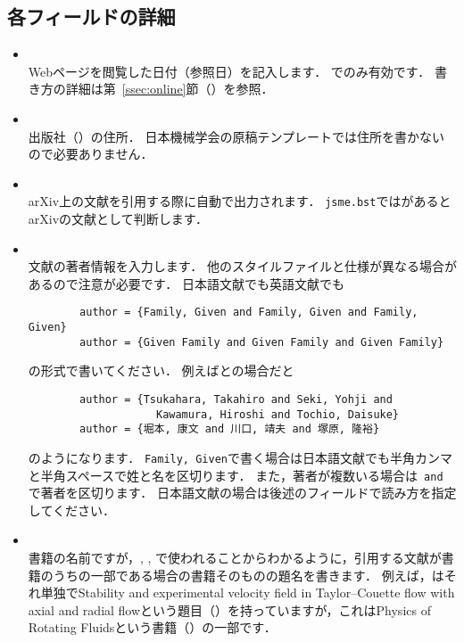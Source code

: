 \documentclass[a4paper,fleqn,uplatex,dvipdfmx]{jsarticle}
\newcommand{\jsmefile}{\texttt{jsme.bst}}
\begin{document}
\subsection{各フィールドの詳細}
\label{ssec:field}
\begin{itemize}
    \item \ttaccess \\
        Webページを閲覧した日付（参照日）を記入します．
        \ttonline でのみ有効です．
        書き方の詳細は第~\ref{ssec:online}節（\ttonline ）を参照．
    \item \ttaddress \\
        出版社（\ttpublisher）の住所．
        日本機械学会の原稿テンプレートでは住所を書かないので必要ありません．
    \item \ttarchivePrefix \\
        arXiv上の文献を引用する際に自動で出力されます．
        \jsmefile では\ttarchivePrefix があるとarXivの文献として判断します．
    \item \ttauthor \\
        文献の著者情報を入力します．
        他の\BibTeX{}スタイルファイルと仕様が異なる場合があるので注意が必要です．
        日本語文献でも英語文献でも
        \begin{verbatim}
        author = {Family, Given and Family, Given and Family, Given}
        author = {Given Family and Given Family and Given Family}
        \end{verbatim}
        の形式で書いてください．
        例えば\citet{Tsukahara:TSFP2005}と\citet{堀本:可視化情報2020}の場合だと
        \begin{verbatim}
        author = {Tsukahara, Takahiro and Seki, Yohji and 
                    Kawamura, Hiroshi and Tochio, Daisuke}
        author = {堀本, 康文 and 川口, 靖夫 and 塚原, 隆裕}
        \end{verbatim}
        のようになります．
        \verb|Family, Given|で書く場合は日本語文献でも半角カンマと半角スペースで姓と名を区切ります．
        また，著者が複数いる場合は\verb| and |で著者を区切ります．
        日本語文献の場合は後述の\ttyomi フィールドで読み方を指定してください．
    \item \ttbooktitle \\
        書籍の名前ですが，\hyperref[ssec:conference]{\ttconference}, \hyperref[ssec:incollection]{\ttincollection}, \hyperref[ssec:inproceedings]{\ttinproceedings}で使われることからわかるように，引用する文献が書籍のうちの一部である場合の書籍そのものの題名を書きます．
        例えば，\citet{Lueptow:Springer2000}はそれ単独でStability and experimental velocity field in Taylor--Couette flow with axial and radial flowという題目（\tttitle）を持っていますが，これはPhysics of Rotating Fluidsという書籍（\ttbooktitle）の一部です．

\end{itemize}
\end{document}
